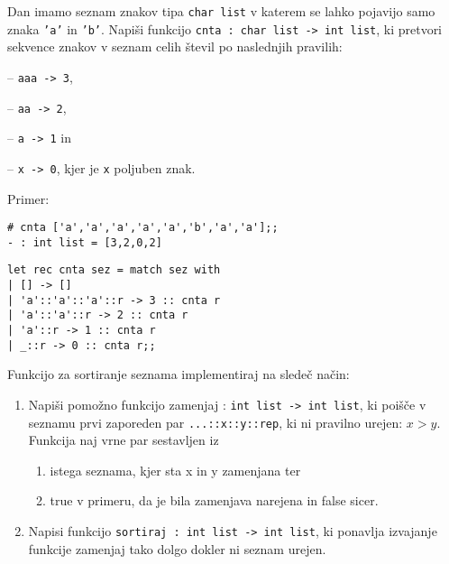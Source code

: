 \begin{ex}
  Dan imamo seznam znakov tipa \texttt{char list} v katerem se lahko
  pojavijo samo znaka \texttt{'a'} in \texttt{'b'}. Napi\v si funkcijo
  \texttt{cnta : char list -> int list}, ki pretvori sekvence znakov v
  seznam celih \v stevil po naslednjih pravilih:

    -- \texttt{aaa -> 3},
    
    -- \texttt{aa -> 2},
    
    -- \texttt{a -> 1} in
    
    -- \texttt{x -> 0}, kjer je \texttt{x} poljuben znak.

\noindent\/Primer:
\begin{verbatim}
# cnta ['a','a','a','a','a','b','a','a'];;
- : int list = [3,2,0,2]
\end{verbatim}

\begin{sol}
\begin{verbatim}
let rec cnta sez = match sez with
| [] -> []
| 'a'::'a'::'a'::r -> 3 :: cnta r 
| 'a'::'a'::r -> 2 :: cnta r 
| 'a'::r -> 1 :: cnta r 
| _::r -> 0 :: cnta r;;
\end{verbatim}
\end{sol}

\end{ex} 
\begin{ex}
Funkcijo za sortiranje seznama implementiraj na slede\v c na\v cin:

\begin{enumerate}
\item Napi\v si pomo\v zno funkcijo zamenjaj : \texttt{int list -> int list}, ki poi\v s\v ce v seznamu prvi zaporeden par \texttt{...::x::y::rep}, ki ni pravilno urejen: $x>y$. Funkcija naj vrne par sestavljen iz 
	\begin{enumerate}
	\item istega seznama, kjer sta x in y zamenjana ter 
    \item true v primeru, da je bila zamenjava narejena in false sicer.
	\end{enumerate}
    \item Napisi funkcijo \texttt{sortiraj : int list -> int list}, ki ponavlja izvajanje funkcije zamenjaj tako dolgo dokler ni seznam urejen.
\end{enumerate}
\end{ex}

